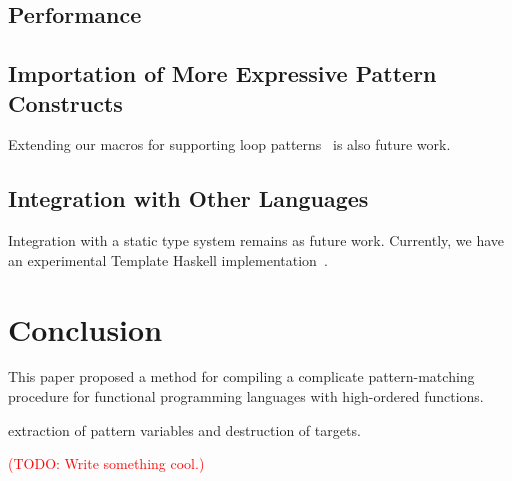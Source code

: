 \documentclass[acmlarge]{acmart}
\newcommand{\todo}[1]{\textcolor{red}{(TODO: #1)}}
\begin{document}
\subsection{Performance}

\subsection{Importation of More Expressive Pattern Constructs}

Extending our macros for supporting loop patterns~\cite{egi2018loop} is also future work.

\subsection{Integration with Other Languages}

Integration with a static type system remains as future work.
Currently, we have an experimental Template Haskell implementation~\cite{egisonHaskell}.

\section{Conclusion}\label{conclusion}

This paper proposed a method for compiling a complicate pattern-matching procedure for functional programming languages with high-ordered functions.

extraction of pattern variables and destruction of targets.

\todo{Write something cool.}




\end{document}
